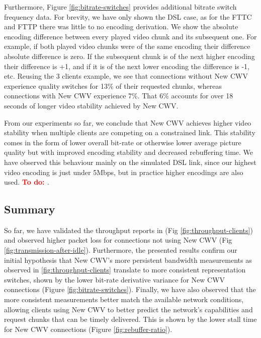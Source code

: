 \documentclass[10pt,sigconf,anonymous]{acmart}
\newcommand{\todo}[1]{\textbf{\textcolor{red}{To do: #1}}}
\begin{document}
Furthermore, Figure \ref{fig:bitrate-switches} provides additional bitrate switch frequency data. For brevity, we have only shown the DSL case, as for the FTTC and FTTP there was little to no encoding derivation. We show the absolute encoding difference between every played video chunk and its subsequent one. For example, if both played video chunks were of the same encoding their difference absolute difference is zero. If the subsequent chunk is of the next higher encoding their difference is +1, and if it is of the next lower encoding the difference is -1, etc. Reusing the 3 clients example, we see that connections without New CWV experience quality switches for 13\% of their requested chunks, whereas connections with New CWV experience 7\%. That 6\% accounts for over 18 seconds of longer video stability achieved by New CWV.

From our experiments so far, we conclude that New CWV achieves higher video stability when multiple clients are competing on a constrained link. This stability comes in the form of lower overall bit-rate or otherwise lower average picture quality but with improved encoding stability and decreased rebuffering time. We have observed this behaviour mainly on the simulated DSL link, since our highest video encoding is just under 5Mbps, but in practice higher encodings are also used. \todo{\cite{}}.


\subsection{Summary}
\label{sec:summary}

So far, we have validated the throughput reports in \cite{Nazir-2014-performance-evaluation-congestion-window-validation-dash-newcwv} (Fig \ref{fig:throughput-clients}) and observed higher packet loss for connections not using New CWV (Fig \ref{fig:transmission-after-idle}). Furthermore, the presented results confirm our initial hypothesis that New CWV's more persistent bandwidth measurements as observed in \ref{fig:throughput-clients} translate to more consistent representation switches, shown by the lower bit-rate derivative variance for New CWV connections (Figure \ref{fig:bitrate-switches}). Finally, we have also observed that the more consistent measurements better match the available network conditions, allowing clients using New CWV to better predict the network's capabilities and request chunks that can be timely delivered. This is shown by the lower stall time for New CWV connections (Figure \ref{fig:rebuffer-ratio}).
\end{document}
